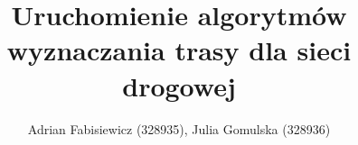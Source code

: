 \documentclass{article}
\title{Uruchomienie algorytmów wyznaczania trasy dla sieci drogowej}
\author{Adrian Fabisiewicz (328935), Julia Gomulska (328936)}
\begin{document}
\maketitle
\renewcommand{\labelenumii}{\arabic{enumi}.\arabic{enumii}}
\renewcommand{\labelenumiii}{\arabic{enumi}.\arabic{enumii}.\arabic{enumiii}}
\renewcommand{\labelenumiv}{\arabic{enumi}.\arabic{enumii}.\arabic{enumiii}.\arabic{enumiv}}
\end{document}
